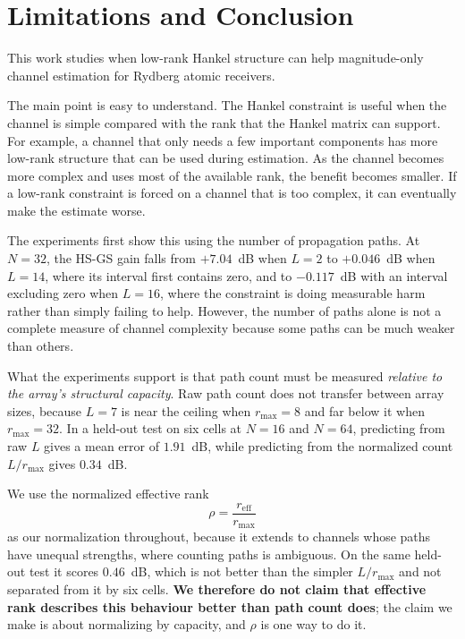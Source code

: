 \documentclass[journal]{IEEEtran}
\newcommand{\rmax}{r_{\mathrm{max}}}
\newcommand{\reff}{r_{\mathrm{eff}}}
\begin{document}
\section{Limitations and Conclusion}

This work studies when low-rank Hankel structure can help magnitude-only
channel estimation for Rydberg atomic receivers.

The main point is easy to understand. The Hankel constraint is useful when the
channel is simple compared with the rank that the Hankel matrix can support.
For example, a channel that only needs a few important components has more
low-rank structure that can be used during estimation. As the channel becomes
more complex and uses most of the available rank, the benefit becomes smaller.
If a low-rank constraint is forced on a channel that is too complex, it can
eventually make the estimate worse.

The experiments first show this using the number of propagation paths. At
$N=32$, the HS-GS gain falls from $+7.04$~dB when $L=2$ to $+0.046$~dB when
$L=14$, where its interval first contains zero, and to $-0.117$~dB with an
interval excluding zero when $L=16$, where the constraint is doing measurable
harm rather than simply failing to help. However, the number of paths alone is not a complete measure of channel
complexity because some paths can be much weaker than others.

What the experiments support is that path count must be measured \emph{relative
to the array's structural capacity}. Raw path count does not transfer between
array sizes, because $L=7$ is near the ceiling when $\rmax=8$ and far below it
when $\rmax=32$. In a held-out test on six cells at $N=16$ and $N=64$,
predicting from raw $L$ gives a mean error of $1.91$~dB, while predicting from
the normalized count $L/\rmax$ gives $0.34$~dB.

We use the normalized effective rank
\begin{equation}
\rho=\frac{\reff}{\rmax}
\end{equation}
as our normalization throughout, because it extends to channels whose paths
have unequal strengths, where counting paths is ambiguous. On the same held-out
test it scores $0.46$~dB, which is not better than the simpler $L/\rmax$ and
not separated from it by six cells. \textbf{We therefore do not claim that
effective rank describes this behaviour better than path count does}; the
claim we make is about normalizing by capacity, and $\rho$ is one way to do it.
\end{document}
